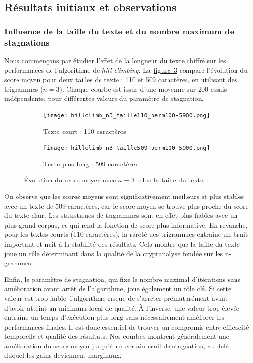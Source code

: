 \documentclass[a4paper]{article}
\newcommand{\figref}[1]{\hyperref[#1]{figure~\ref*{#1}}}
\begin{document}
\subsection{Résultats initiaux et observations}

\subsubsection{Influence de la taille du texte et du nombre maximum de stagnations}

Nous commençons par étudier l’effet de la longueur du texte chiffré sur les performances de l’algorithme de \textit{hill climbing}. La~\figref{fig:n3-tailles} compare l’évolution du score moyen pour deux tailles de texte : 110 et 509 caractères, en utilisant des trigrammes ($n = 3$). Chaque courbe est issue d’une moyenne sur 200 essais indépendants, pour différentes valeurs du paramètre de stagnation.

\begin{figure}[H]
    \centering
    \begin{subfigure}[b]{0.49\textwidth}
        \texttt{[image: hillclimb\_n3\_taille110\_perm100-5900.png]}
        \caption{Texte court : 110 caractères}
        \label{fig:n3-110}
    \end{subfigure}
    \hfill
    \begin{subfigure}[b]{0.49\textwidth}
        \texttt{[image: hillclimb\_n3\_taille509\_perm100-5900.png]}
        \caption{Texte plus long : 509 caractères}
        \label{fig:n3-509}
    \end{subfigure}
    \caption{Évolution du score moyen avec $n = 3$ selon la taille du texte.}
    \label{fig:n3-tailles}
\end{figure}

On observe que les scores moyens sont significativement meilleurs et plus stables avec un texte
de 509 caractères, car le score moyen se trouve plus proche du score du texte clair. Les statistiques
de trigrammes sont en effet plus fiables avec un plus grand corpus, ce qui rend la fonction de score
plus informative. En revanche, pour les textes courts (110 caractères), la rareté des trigrammes
entraîne un bruit important et nuit à la stabilité des résultats. Cela montre que la taille du texte
joue un rôle déterminant dans la qualité de la cryptanalyse fondée sur les n-grammes.

Enfin, le paramètre de stagnation, qui fixe le nombre maximal d’itérations sans amélioration
avant arrêt de l’algorithme, joue également un rôle clé. Si cette valeur est trop faible, l’algorithme
risque de s’arrêter prématurément avant d’avoir atteint un minimum local de qualité. À l’inverse,
une valeur trop élevée entraîne un temps d’exécution plus long sans nécessairement améliorer les
performances finales. Il est donc essentiel de trouver un compromis entre efficacité temporelle et
qualité des résultats. Nos courbes montrent généralement une amélioration du score moyen jusqu’à
un certain seuil de stagnation, au-delà duquel les gains deviennent marginaux.
\end{document}
